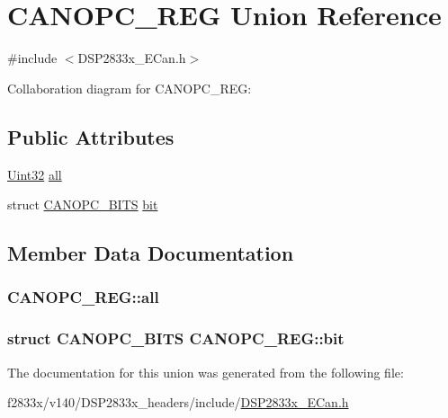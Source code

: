 \hypertarget{union_c_a_n_o_p_c___r_e_g}{}\section{C\+A\+N\+O\+P\+C\+\_\+\+R\+E\+G Union Reference}
\label{union_c_a_n_o_p_c___r_e_g}


{\ttfamily \#include $<$D\+S\+P2833x\+\_\+\+E\+Can.\+h$>$}



Collaboration diagram for C\+A\+N\+O\+P\+C\+\_\+\+R\+E\+G\+:
\subsection*{Public Attributes}
\begin{DoxyCompactItemize}
\item 
\hyperlink{_d_s_p2833x___device_8h_aba99025e657f892beb7ff31cecf64653}{Uint32} \hyperlink{union_c_a_n_o_p_c___r_e_g_aa459d68eab71b3d5bcf06c68c9f8181e}{all}
\item 
struct \hyperlink{struct_c_a_n_o_p_c___b_i_t_s}{C\+A\+N\+O\+P\+C\+\_\+\+B\+I\+T\+S} \hyperlink{union_c_a_n_o_p_c___r_e_g_a5f10be15437fab2525ca4d029de8d660}{bit}
\end{DoxyCompactItemize}


\subsection{Member Data Documentation}
\hypertarget{union_c_a_n_o_p_c___r_e_g_aa459d68eab71b3d5bcf06c68c9f8181e}{}
\subsubsection[{all}]{ C\+A\+N\+O\+P\+C\+\_\+\+R\+E\+G\+::all}\label{union_c_a_n_o_p_c___r_e_g_aa459d68eab71b3d5bcf06c68c9f8181e}
\hypertarget{union_c_a_n_o_p_c___r_e_g_a5f10be15437fab2525ca4d029de8d660}{}
\subsubsection[{bit}]{\setlength{\rightskip}{0pt plus 5cm}struct {\bf C\+A\+N\+O\+P\+C\+\_\+\+B\+I\+T\+S} C\+A\+N\+O\+P\+C\+\_\+\+R\+E\+G\+::bit}\label{union_c_a_n_o_p_c___r_e_g_a5f10be15437fab2525ca4d029de8d660}


The documentation for this union was generated from the following file\+:\begin{DoxyCompactItemize}
\item 
f2833x/v140/\+D\+S\+P2833x\+\_\+headers/include/\hyperlink{_d_s_p2833x___e_can_8h}{D\+S\+P2833x\+\_\+\+E\+Can.\+h}\end{DoxyCompactItemize}
